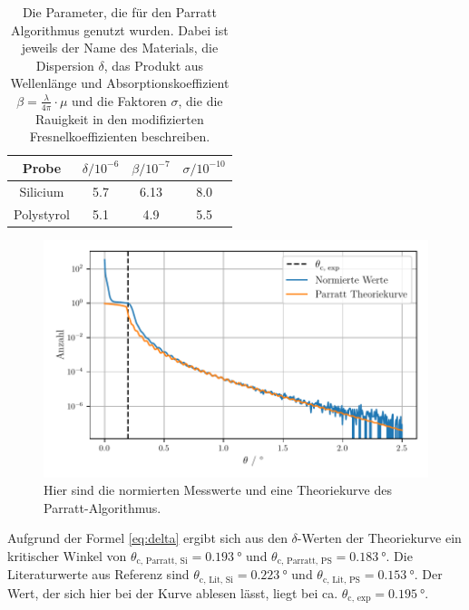 \begin{table} \caption{Die Parameter, die für den Parratt Algorithmus genutzt wurden. Dabei ist jeweils der Name des Materials, die Dispersion $\delta$, das Produkt aus Wellenlänge und Absorptionskoeffizient $\beta = \frac{\lambda}{4 \pi} \cdot \mu$ und die Faktoren $\sigma$, die die Rauigkeit in den modifizierten Fresnelkoeffizienten beschreiben.}
    \label{tab:parratt}
    \centering
    \begin{tabular}{c S[] S[] S[]}
        \toprule
        {Probe} & {$\delta / 10^{-6}$} & {$\beta / 10^{-7}$} & {$\sigma / 10^{-10}$} \\
        \midrule
        Silicium   & 5.7 & 6.13 & 8.0 \\
        Polystyrol & 5.1 & 4.9  & 5.5 \\
        \bottomrule
    \end{tabular}
\end{table}


\begin{figure}
    \centering
    \includegraphics[width=\textwidth]{figures/parat.pdf}
    \caption{Hier sind die normierten Messwerte und eine Theoriekurve des Parratt-Algorithmus.}
    \label{abb:parratt}
\end{figure}

Aufgrund der Formel \eqref{eq:delta} ergibt sich aus den $\delta$-Werten der Theoriekurve ein kritischer Winkel von $\theta_\text{c, Parratt, Si}= \SI{0.193}{\degree}$ und $\theta_\text{c, Parratt, PS}= \SI{0.183}{\degree}$. Die Literaturwerte aus Referenz \cite{skript} sind $\theta_\text{c, Lit, Si}= \SI{0.223}{\degree}$ und $\theta_\text{c, Lit, PS}= \SI{0.153}{\degree}$. 
Der Wert, der sich hier bei der Kurve ablesen lässt, liegt bei ca. $\theta_\text{c, exp}= \SI{0.195}{\degree}$.

